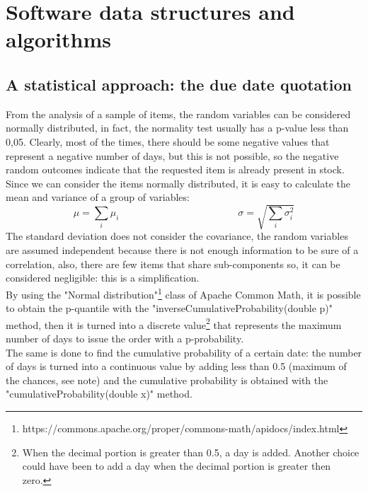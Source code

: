 \documentclass[a4paper,12pt]{article}
\begin{document}
\newpage
\section{Software data structures and algorithms}

\subsection{A statistical approach: the due date quotation}
From the analysis of a sample of items, the random variables can be considered normally distributed, in fact, the normality test usually has a p-value less than 0,05. Clearly, most of the times, there should be some negative values that represent a negative number of days, but this is not possible, so the negative random outcomes indicate that the requested item is already present in stock. Since we can consider the items normally distributed, it is easy to calculate the mean and variance of a group of variables:
\begin{equation*}
\mu = \sum_{i} \mu_{i} 		 \qquad \qquad \qquad \qquad \qquad \qquad 			\sigma = \sqrt{\sum_{i} \sigma_{i}^{2}}
\end{equation*}
The standard deviation does not consider the covariance, the random variables are assumed independent because there is not enough information to be sure of a correlation, also, there are few items that share sub-components so, it can be considered negligible: this is a simplification. \\

By using the "Normal distribution"\footnote{https://commons.apache.org/proper/commons-math/apidocs/index.html} class of Apache Common Math, it is possible to obtain the p-quantile with the "inverseCumulativeProbability(double p)" method, then it is turned into a discrete value\footnote{When the decimal portion is greater than 0.5, a day is added. Another choice could have been to add a day when the decimal portion is greater then zero.} that represents the maximum number of days to issue the order with a p-probability. \\
The same is done to find the cumulative probability of a certain date: the number of days is turned into a continuous value by adding less than 0.5 (maximum of the chances, see note) and the cumulative probability is obtained with the "cumulativeProbability(double x)" method.
\end{document}
